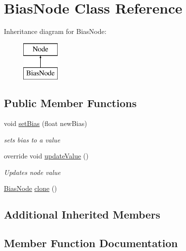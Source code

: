 \hypertarget{class_bias_node}{}\section{Bias\+Node Class Reference}
\label{class_bias_node}
Inheritance diagram for Bias\+Node\+:\begin{figure}[H]
\begin{center}
\leavevmode
\includegraphics[height=2.000000cm]{class_bias_node}
\end{center}
\end{figure}
\subsection*{Public Member Functions}
\begin{DoxyCompactItemize}
\item 
void \mbox{\hyperlink{class_bias_node_a73832b9f58014cc9f17788ce64f56989}{set\+Bias}} (float new\+Bias)
\begin{DoxyCompactList}\small\item\em sets bias to a value \end{DoxyCompactList}\item 
override void \mbox{\hyperlink{class_bias_node_a84e7e92b97256707aba057ec92bd7a79}{update\+Value}} ()
\begin{DoxyCompactList}\small\item\em Updates node value \end{DoxyCompactList}\item 
\mbox{\hyperlink{class_bias_node}{Bias\+Node}} \mbox{\hyperlink{class_bias_node_aa948061d92ef7e0b8d470a0b6c01b7a1}{clone}} ()
\end{DoxyCompactItemize}
\subsection*{Additional Inherited Members}


\subsection{Member Function Documentation}
\mbox{\label{class_bias_node_aa948061d92ef7e0b8d470a0b6c01b7a1}} 
